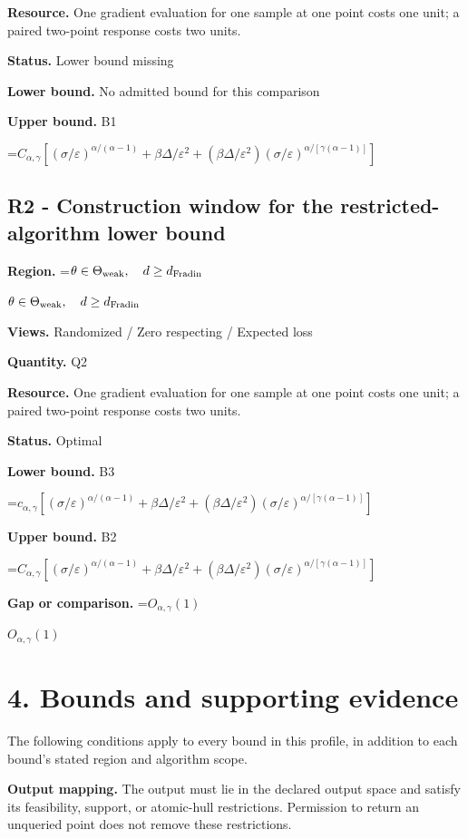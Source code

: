 \documentclass[10pt,a4paper]{article}
\newcommand{\AtlasMath}[1]{\par\begingroup\centering\setbox0=\hbox{$\displaystyle #1$}\ifdim\wd0>1.4\linewidth\typeout{ATLAS WIDE FORMULA: \the\wd0}\fi\ifdim\wd0>\linewidth\resizebox{\linewidth}{!}{\box0}\else\box0\fi\par\endgroup}
\newcommand{\AtlasInlineMath}[1]{\begingroup\setbox0=\hbox{$#1$}\ifdim\wd0>.4\linewidth\endgroup\AtlasMath{#1}\else\endgroup$#1$\fi}
\begin{document}
\textbf{Resource.} One gradient evaluation for one sample at one point costs one unit; a paired two-point response costs two units.

\textbf{Status.} Lower bound missing

\textbf{Lower bound.} No admitted bound for this comparison

\textbf{Upper bound.} B1

\AtlasMath{C_{\alpha,\gamma}[(\sigma/\varepsilon)^{\alpha/(\alpha-1)}+\beta\Delta/\varepsilon^2+(\beta\Delta/\varepsilon^2)(\sigma/\varepsilon)^{\alpha/[\gamma(\alpha-1)]}]}
\subsection{R2 - Construction window for the restricted-algorithm lower bound}
\textbf{Region.} \AtlasInlineMath{\theta\in\Theta_{\rm weak},\quad d\ge d_{\rm Fradin}}

\textbf{Views.} Randomized / Zero respecting / Expected loss

\textbf{Quantity.} Q2

\textbf{Resource.} One gradient evaluation for one sample at one point costs one unit; a paired two-point response costs two units.

\textbf{Status.} Optimal

\textbf{Lower bound.} B3

\AtlasMath{c_{\alpha,\gamma}[(\sigma/\varepsilon)^{\alpha/(\alpha-1)}+\beta\Delta/\varepsilon^2+(\beta\Delta/\varepsilon^2)(\sigma/\varepsilon)^{\alpha/[\gamma(\alpha-1)]}]}
\textbf{Upper bound.} B2

\AtlasMath{C_{\alpha,\gamma}[(\sigma/\varepsilon)^{\alpha/(\alpha-1)}+\beta\Delta/\varepsilon^2+(\beta\Delta/\varepsilon^2)(\sigma/\varepsilon)^{\alpha/[\gamma(\alpha-1)]}]}
\textbf{Gap or comparison.} \AtlasInlineMath{O_{\alpha,\gamma}(1)}

\section{4. Bounds and supporting evidence}
The following conditions apply to every bound in this profile, in addition to each bound's stated region and algorithm scope.

\textbf{Output mapping.} The output must lie in the declared output space and satisfy its feasibility, support, or atomic-hull restrictions. Permission to return an unqueried point does not remove these restrictions.
\end{document}
